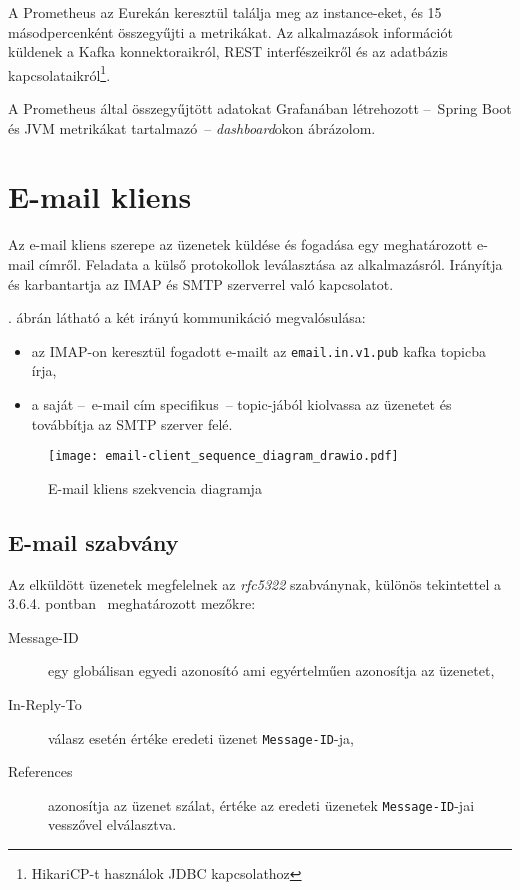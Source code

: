 A Prometheus az Eurekán keresztül találja meg az instance-eket, és 15 másodpercenként összegyűjti a metrikákat. Az alkalmazások információt küldenek a Kafka konnektoraikról, REST interfészeikről és az adatbázis kapcsolataikról\footnote{HikariCP-t használok JDBC kapcsolathoz}.

A Prometheus által összegyűjtött adatokat Grafanában létrehozott --~Spring Boot és JVM metrikákat tartalmazó~--   \emph{dashboard}okon ábrázolom.


\section{E-mail kliens}
Az e-mail kliens szerepe az üzenetek küldése és fogadása egy meghatározott e-mail címről. Feladata a külső protokollok leválasztása az alkalmazásról. Irányítja és karbantartja az IMAP és SMTP szerverrel való kapcsolatot.

. ábrán látható a két irányú kommunikáció megvalósulása:
\begin{itemize}
	\item az IMAP-on keresztül fogadott e-mailt az \texttt{email.in.v1.pub} kafka topicba írja,
	\item a saját --~e-mail cím specifikus~-- topic-jából kiolvassa az üzenetet és továbbítja  az SMTP szerver felé.
\end{itemize}


\begin{figure}[hbt] 
	\centering
	\texttt{[image: email-client\_sequence\_diagram\_drawio.pdf]}
	\caption{E-mail kliens szekvencia diagramja}
	\label{fig:email-client_sequence_diagram}
\end{figure}




\subsection{E-mail szabvány}
Az elküldött üzenetek megfelelnek az \emph{rfc5322} szabványnak, különös tekintettel a 3.6.4. pontban~\cite{rfc5322_Identification_Fields} meghatározott mezőkre:

\begin{description}
	\item[Message-ID] egy globálisan egyedi azonosító ami egyértelműen azonosítja az üzenetet,
	
	\item[In-Reply-To] válasz esetén értéke eredeti üzenet \texttt{Message-ID}-ja,
	
	\item[References] azonosítja az üzenet szálat, értéke az eredeti üzenetek \texttt{Message-ID}-jai vesszővel elválasztva.
\end{description}

